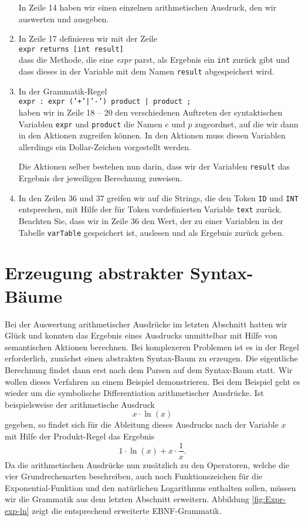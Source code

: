\begin{enumerate}
      In Zeile 14 haben wir einen einzelnen arithmetischen Ausdruck, den wir auswerten und ausgeben.
\item In Zeile 17 definieren wir mit der Zeile
      \\[0.2cm]
      \hspace*{1.3cm}
      \texttt{expr returns [int result]}
      \\[0.2cm]
      dass die Methode, die eine \textsl{expr} parst, als Ergebnis ein \texttt{int} zur\"uck
      gibt und dass dieses in der Variable mit dem Namen \texttt{result} abgespeichert wird.
\item In der Grammatik-Regel
      \\[0.2cm]
      \hspace*{1.3cm}
      \texttt{expr : expr ('+'|'-') product | product ;}
      \\[0.2cm]
      haben wir in Zeile 18 -- 20 den verschiedenen Auftreten der syntaktischen Variablen
      \texttt{expr} und \texttt{product} die Namen $e$ und $p$ zugeordnet, auf die wir dann in den
      Aktionen zugreifen k\"onnen.  In den Aktionen muss diesen Variablen allerdings ein Dollar-Zeichen
      vorgestellt werden.

      Die Aktionen selber bestehen nun darin, dass wir der Variablen \texttt{result}
      das Ergebnis der jeweiligen Berechnung zuweisen.
\item In den Zeilen 36 und 37 greifen wir auf die Strings, die den Token
      \texttt{ID} und \texttt{INT} entsprechen, mit Hilfe der f\"ur Token vordefinierten
      Variable \texttt{text} zur\"uck.  Beachten Sie, dass wir in Zeile 36 den Wert, der zu einer
      Variablen in der Tabelle \texttt{varTable} gespeichert ist, auslesen und als Ergebnis zur\"uck
      geben. 
\end{enumerate}

\section{Erzeugung abstrakter Syntax-B\"aume}
Bei der Auswertung arithmetischer Ausdr\"ucke im letzten Abschnitt hatten wir Gl\"uck
und konnten das Ergebnis eines Ausdrucks unmittelbar mit Hilfe von semantischen Aktionen
berechnen.  Bei komplexeren Problemen ist es in der Regel erforderlich, zun\"achst einen
abstrakten Syntax-Baum zu erzeugen.  Die eigentliche Berechnung findet dann erst nach dem
Parsen auf dem Syntax-Baum statt.  Wir wollen dieses Verfahren an einem Beispiel
demonstrieren.  Bei dem Beispiel geht es wieder um die symbolische Differentiation
arithmetischer Ausdr\"ucke.  Ist beispielsweise der arithmetische Ausdruck 
\[ x \cdot \ln(x) \]
gegeben, so findet sich f\"ur die Ableitung dieses Ausdrucks nach der Variable $x$ mit Hilfe
der Produkt-Regel das
Ergebnis 
\[ 1 \cdot \ln(x) + x \cdot \frac{1}{x}. \]  
Da die arithmetischen Ausdr\"ucke nun
zus\"atzlich zu den Operatoren, welche die vier Grundrechenarten beschreiben, auch noch 
Funktionszeichen f\"ur die Exponential-Funktion und den nat\"urlichen Logarithmus enthalten
sollen, m\"ussen wir die Grammatik aus dem letzten Abschnitt erweitern.
Abbildung \ref{fig:Expr-exp-ln} zeigt die entsprechend erweiterte EBNF-Grammatik.

